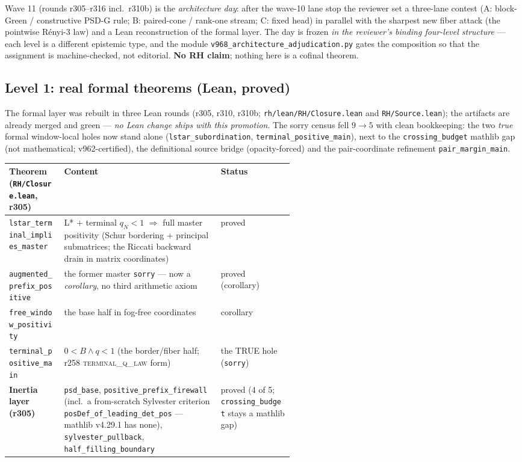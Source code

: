 \documentclass[11pt]{article}
\theoremstyle{definition}
\theoremstyle{remark}
\begin{document}
Wave 11 (rounds r305--r316 incl.\ r310b) is the \emph{architecture
day}: after the wave-10 lane stop the reviewer set a three-lane
contest (A: block-Green / constructive PSD-G rule; B: paired-cone /
rank-one stream; C: fixed head) in parallel with the sharpest new
fiber attack (the pointwise R\'enyi-3 law) and a Lean reconstruction
of the formal layer.  The day is frozen \emph{in the reviewer's
binding four-level structure} --- each level is a different epistemic
type, and the module \texttt{v968\_architecture\_adjudication.py}
gates the composition so that the assignment is machine-checked, not
editorial.  \textbf{No RH claim}; nothing here is a cofinal theorem.

\subsection{Level 1: real formal theorems (Lean, proved)}

The formal layer was rebuilt in three Lean rounds (r305, r310,
r310b; \texttt{rh/lean/RH/Closure.lean} and
\texttt{RH/Source.lean}); the artifacts are already merged and
green --- \emph{no Lean change ships with this promotion}.  The
sorry census fell $9 \to 5$ with clean bookkeeping: the two
\emph{true} formal window-local holes now stand alone
(\texttt{lstar\_subordination}, \texttt{terminal\_positive\_main}),
next to the \texttt{crossing\_budget} mathlib gap (not
mathematical; v962-certified), the definitional source bridge
(opacity-forced) and the pair-coordinate refinement
\texttt{pair\_margin\_main}.

\begin{center}\small
\begin{tabular}{@{}lp{0.55\linewidth}l@{}}
\toprule
\textbf{Theorem (\texttt{RH/Closure.lean}, r305)} & \textbf{Content}
& \textbf{Status}\\
\midrule
\texttt{lstar\_terminal\_implies\_master} & L* $+$ terminal $q_N<1$
$\Rightarrow$ full master positivity (Schur bordering $+$ principal
submatrices; the Riccati backward drain in matrix coordinates) &
proved\\
\texttt{augmented\_prefix\_positive} & the former master
\texttt{sorry} --- now a \emph{corollary}, no third arithmetic
axiom & proved (corollary)\\
\texttt{free\_window\_positivity} & the base half in fog-free
coordinates & corollary\\
\texttt{terminal\_positive\_main} & $0 < B \wedge q < 1$ (the
border/fiber half; r258 \textsc{terminal\_q\_law} form) & the
TRUE hole (\texttt{sorry})\\
\midrule
\textbf{Inertia layer (r305)} & \texttt{psd\_base},
\texttt{positive\_prefix\_firewall} (incl.\ a from-scratch Sylvester
criterion \texttt{posDef\_of\_leading\_det\_pos} --- mathlib v4.29.1
has none), \texttt{sylvester\_pullback},
\texttt{half\_filling\_boundary} & proved (4 of 5;
\texttt{crossing\_budget} stays a mathlib gap)\\
\bottomrule
\end{tabular}
\end{center}
\end{document}
